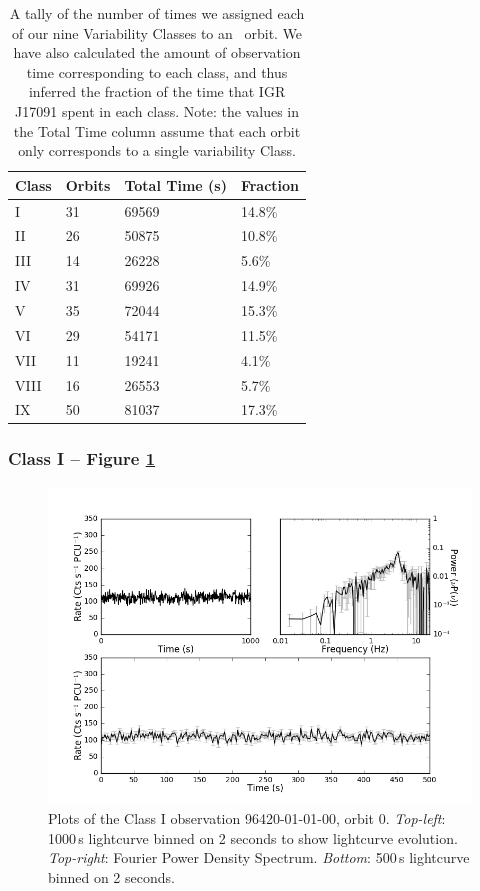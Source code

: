 \begin{table}
\centering
\begin{tabular}{llll}
\hline
\hline
\scriptsize Class &\scriptsize  Orbits &\scriptsize Total Time (s) &\scriptsize Fraction \\
\hline
I & 31 &  69569 & 14.8\%\\
II & 26 &  50875 & 10.8\%\\
III & 14 &  26228 & 5.6\%\\
IV & 31 &  69926 & 14.9\%\\
V & 35 &  72044 & 15.3\%\\
VI & 29 &  54171 & 11.5\%\\
VII & 11 &  19241 & 4.1\%\\
VIII & 16 &  26553 & 5.7\%\\
IX & 50 &  81037 & 17.3\%\\
\hline
\hline
\end{tabular}
\caption{A tally of the number of times we assigned each of our nine Variability Classes to an \rxte\ orbit.  We have also calculated the amount of observation time corresponding to each class, and thus inferred the fraction of the time that IGR J17091 spent in each class.  Note: the values in the Total Time column assume that each orbit only corresponds to a single variability Class.}
\label{tab:CPopD}
\end{table}



\subsubsection{Class I --  Figure \ref{fig:Bmulti}}
\label{sec:ClassI}

\begin{figure}
    \includegraphics[width=0.8\columnwidth, trim = 0.6cm 0 3.9cm 0]{images/Bmulti.png}
    \captionsetup{singlelinecheck=off}
    \caption{Plots of the Class I observation 96420-01-01-00, orbit 0.  \textit{Top-left}: 1000\,s lightcurve binned on 2 seconds to show lightcurve evolution.  \textit{Top-right}: Fourier Power Density Spectrum.  \textit{Bottom}: 500\,s lightcurve binned on 2 seconds.}
   \label{fig:Bmulti}
\end{figure}

